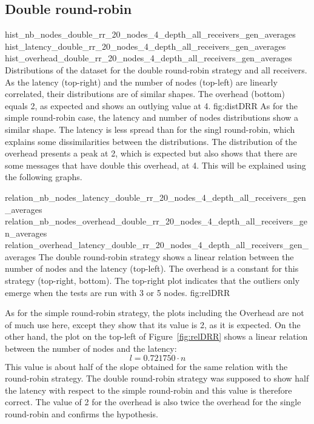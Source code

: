 \subsection{Double round-robin}
\triplefigure
    {hist_nb_nodes_double_rr_20_nodes_4_depth_all_receivers_gen_averages}
    {hist_latency_double_rr_20_nodes_4_depth_all_receivers_gen_averages}
    {hist_overhead_double_rr_20_nodes_4_depth_all_receivers_gen_averages}
    {Distributions of the dataset for the double round-robin strategy and all
    receivers. As the latency (top-right) and the number of nodes (top-left) are
    linearly correlated, their distributions are of similar shapes. The
    overhead (bottom) equals 2, as expected and shows an outlying value at 4.}
    {fig:distDRR}
As for the simple round-robin case, the latency and number of nodes
distributions show a similar shape. The latency is less spread than for the
singl round-robin, which explains some dissimilarities between the
distributions. The distribution of the overhead presents a peak at 2, which is
expected but also shows that there are some messages that have double this
overhead, at 4. This will be explained using the following graphs. 

\triplefigure
    {relation_nb_nodes_latency_double_rr_20_nodes_4_depth_all_receivers_gen_averages}
    {relation_nb_nodes_overhead_double_rr_20_nodes_4_depth_all_receivers_gen_averages}
    {relation_overhead_latency_double_rr_20_nodes_4_depth_all_receivers_gen_averages}
    {The double round-robin strategy shows a linear relation between the number of
    nodes and the latency (top-left). The overhead is a constant for this
    strategy (top-right, bottom). The top-right plot indicates that the outliers
    only emerge when the tests are run with 3 or 5 nodes.}
    {fig:relDRR}

As for the simple round-robin strategy, the plots including the Overhead are not
of much use here, except they show that its value is 2, as it is expected. 
On the other hand, the plot on the top-left of Figure~\ref{fig:relDRR} shows a
linear relation between the number of nodes and the latency: 
\[l = 0.721750 \cdot n\]
This value is about half of the slope obtained for the same relation with the
round-robin strategy. The double round-robin strategy was supposed to show half
the latency with respect to the simple round-robin and this value is therefore
correct. The value of 2 for the overhead is also twice the overhead for the
single round-robin and confirms the hypothesis.
    

